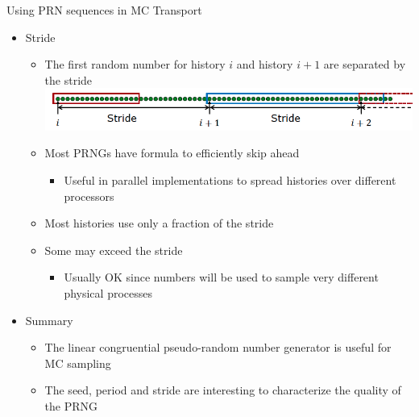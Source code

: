 \documentclass[xcolor=x11names,compress]{beamer}
\renewcommand{\(}{\begin{columns}}
\renewcommand{\)}{\end{columns}}
\newcommand{\<}[1]{\begin{column}{#1}}
\renewcommand{\>}{\end{column}}
\begin{document}
\begin{frame}{Using PRN sequences in MC Transport}
\begin{itemize}
\item Stride
\begin{itemize}
\item The first random number for history $i$ and history $i+1$ are separated by the stride
\includegraphics[scale=0.35]{../figs/rng3}
\item Most PRNGs have formula to efficiently skip ahead
\begin{itemize}
\item Useful in parallel implementations to spread histories over different processors
\end{itemize}
\item Most histories use only a fraction of the stride
\item Some may exceed the stride
\begin{itemize}
\item Usually OK since numbers will be used to sample very different physical processes
\end{itemize}
\end{itemize}  	
\item Summary
\begin{itemize}
\item The linear congruential pseudo-random number generator is useful for MC sampling
\item The seed, period and stride are interesting to characterize the quality of the PRNG
\end{itemize}
\end{itemize}  	
\end{frame}
\end{document}
